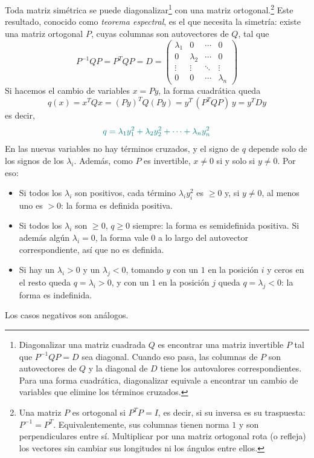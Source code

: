 \documentclass{article}
\begin{document}
Toda matriz simétrica se puede diagonalizar\footnote{Diagonalizar una matriz cuadrada \(Q\) es encontrar una matriz invertible \(P\) tal que \(P^{-1}QP=D\) sea diagonal. Cuando eso pasa, las columnas de \(P\) son autovectores de \(Q\) y la diagonal de \(D\) tiene los autovalores correspondientes. Para una forma cuadrática, diagonalizar equivale a encontrar un cambio de variables que elimine los términos cruzados.} con una matriz ortogonal.\footnote{Una matriz \(P\) es ortogonal si \(P^TP=I\), es decir, si su inversa es su traspuesta: \(P^{-1}=P^T\). Equivalentemente, sus columnas tienen norma \(1\) y son perpendiculares entre sí. Multiplicar por una matriz ortogonal rota (o refleja) los vectores sin cambiar sus longitudes ni los ángulos entre ellos.} Este resultado, conocido como \emph{teorema espectral}, es el que necesita la simetría: existe una matriz ortogonal \(P\), cuyas columnas son autovectores de \(Q\), tal que
\[
P^{-1}QP=P^TQP=D=
\begin{pmatrix}
\lambda_1 & 0 & \cdots & 0\\
0 & \lambda_2 & \cdots & 0\\
\vdots & \vdots & \ddots & \vdots\\
0 & 0 & \cdots & \lambda_n
\end{pmatrix}
\]
Si hacemos el cambio de variables \(x=Py\), la forma cuadrática queda
\[
q(x)=x^TQx=(Py)^TQ(Py)=y^T\,(P^TQP)\,y=y^TDy
\]
es decir,
\[\color{teal}
q=\lambda_1y_1^2+\lambda_2y_2^2+\cdots+\lambda_ny_n^2
\]
En las nuevas variables no hay términos cruzados, y el signo de \(q\) depende solo de los signos de los \(\lambda_i\). Además, como \(P\) es invertible, \(x\neq0\) si y solo si \(y\neq0\). Por eso:
\begin{itemize}
  \item Si todos los \(\lambda_i\) son positivos, cada término \(\lambda_iy_i^2\) es \(\ge0\) y, si \(y\neq0\), al menos uno es \(>0\): la forma es definida positiva.
  \item Si todos los \(\lambda_i\) son \(\ge0\), \(q\ge0\) siempre: la forma es semidefinida positiva. Si además algún \(\lambda_i=0\), la forma vale \(0\) a lo largo del autovector correspondiente, así que no es definida.
  \item Si hay un \(\lambda_i>0\) y un \(\lambda_j<0\), tomando \(y\) con un \(1\) en la posición \(i\) y ceros en el resto queda \(q=\lambda_i>0\), y con un \(1\) en la posición \(j\) queda \(q=\lambda_j<0\): la forma es indefinida.
\end{itemize}
Los casos negativos son análogos.
\end{document}
